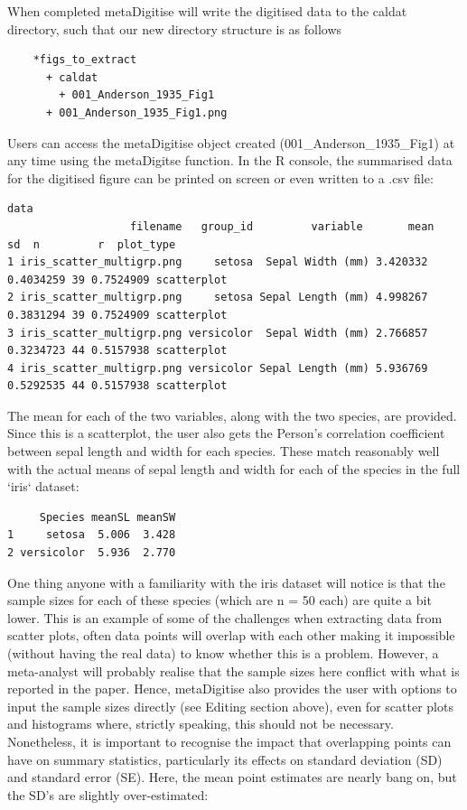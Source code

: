 \documentclass{article}
\begin{document}
When completed metaDigitise will write the digitised data to the caldat directory, such that our new directory structure is as follows

\begin{lstlisting}
	*figs_to_extract
	  + caldat
	  	+ 001_Anderson_1935_Fig1
      + 001_Anderson_1935_Fig1.png
\end{lstlisting}

Users can access the metaDigitise object created (001\_Anderson\_1935\_Fig1) at any time using the metaDigitse function. In the R console, the summarised data for the digitised figure can be printed on screen or even written to a .csv file:

\begin{lstlisting}
data
                   filename   group_id         variable       mean      sd  n         r  plot_type
1 iris_scatter_multigrp.png     setosa  Sepal Width (mm) 3.420332 0.4034259 39 0.7524909 scatterplot
2 iris_scatter_multigrp.png     setosa Sepal Length (mm) 4.998267 0.3831294 39 0.7524909 scatterplot
3 iris_scatter_multigrp.png versicolor  Sepal Width (mm) 2.766857 0.3234723 44 0.5157938 scatterplot
4 iris_scatter_multigrp.png versicolor Sepal Length (mm) 5.936769 0.5292535 44 0.5157938 scatterplot
\end{lstlisting}

The mean for each of the two variables, along with the two species, are provided. Since this is a scatterplot, the user also gets the Person's correlation coefficient between sepal length and width for each species. These match reasonably well with the actual means of sepal length and width for each of the species in the full `iris` dataset:

\begin{lstlisting}
     Species meanSL meanSW
1     setosa  5.006  3.428
2 versicolor  5.936  2.770
\end{lstlisting}

One thing anyone with a familiarity with the iris dataset will notice is that the sample sizes for each of these species (which are n = 50 each) are quite a bit lower. This is an example of some of the challenges when extracting data from scatter plots, often data points will overlap with each other making it impossible (without having the real data) to know whether this is a problem. However, a meta-analyst will probably realise that the sample sizes here conflict with what is reported in the paper. Hence, metaDigitise also provides the user with  options to input the sample sizes directly (see Editing section above), even for scatter plots and histograms where, strictly speaking, this should not be necessary. Nonetheless, it is important to recognise the impact that overlapping points can have on summary statistics, particularly its effects on standard deviation (SD) and standard error (SE). Here, the mean point estimates are nearly bang on, but the SD's are slightly over-estimated:
\end{document}
